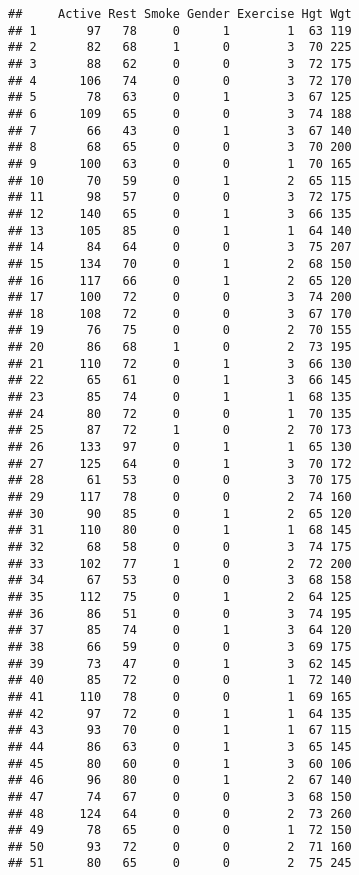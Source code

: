 \documentclass[
]{article}
\begin{document}
\begin{verbatim}
##     Active Rest Smoke Gender Exercise Hgt Wgt
## 1       97   78     0      1        1  63 119
## 2       82   68     1      0        3  70 225
## 3       88   62     0      0        3  72 175
## 4      106   74     0      0        3  72 170
## 5       78   63     0      1        3  67 125
## 6      109   65     0      0        3  74 188
## 7       66   43     0      1        3  67 140
## 8       68   65     0      0        3  70 200
## 9      100   63     0      0        1  70 165
## 10      70   59     0      1        2  65 115
## 11      98   57     0      0        3  72 175
## 12     140   65     0      1        3  66 135
## 13     105   85     0      1        1  64 140
## 14      84   64     0      0        3  75 207
## 15     134   70     0      1        2  68 150
## 16     117   66     0      1        2  65 120
## 17     100   72     0      0        3  74 200
## 18     108   72     0      0        3  67 170
## 19      76   75     0      0        2  70 155
## 20      86   68     1      0        2  73 195
## 21     110   72     0      1        3  66 130
## 22      65   61     0      1        3  66 145
## 23      85   74     0      1        1  68 135
## 24      80   72     0      0        1  70 135
## 25      87   72     1      0        2  70 173
## 26     133   97     0      1        1  65 130
## 27     125   64     0      1        3  70 172
## 28      61   53     0      0        3  70 175
## 29     117   78     0      0        2  74 160
## 30      90   85     0      1        2  65 120
## 31     110   80     0      1        1  68 145
## 32      68   58     0      0        3  74 175
## 33     102   77     1      0        2  72 200
## 34      67   53     0      0        3  68 158
## 35     112   75     0      1        2  64 125
## 36      86   51     0      0        3  74 195
## 37      85   74     0      1        3  64 120
## 38      66   59     0      0        3  69 175
## 39      73   47     0      1        3  62 145
## 40      85   72     0      0        1  72 140
## 41     110   78     0      0        1  69 165
## 42      97   72     0      1        1  64 135
## 43      93   70     0      1        1  67 115
## 44      86   63     0      1        3  65 145
## 45      80   60     0      1        3  60 106
## 46      96   80     0      1        2  67 140
## 47      74   67     0      0        3  68 150
## 48     124   64     0      0        2  73 260
## 49      78   65     0      0        1  72 150
## 50      93   72     0      0        2  71 160
## 51      80   65     0      0        2  75 245

\end{verbatim}
\end{document}
